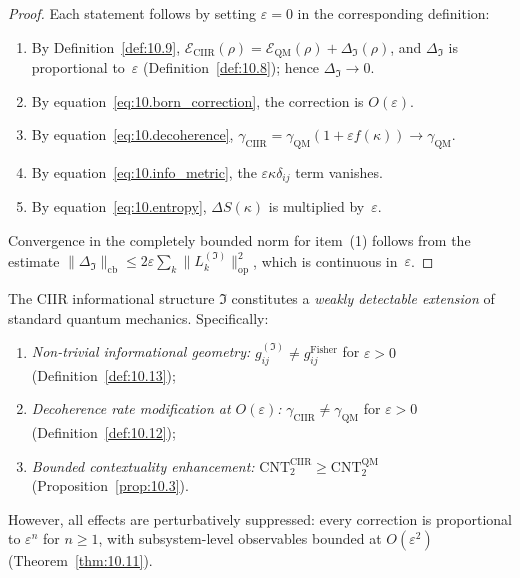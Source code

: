 \begin{proof}
Each statement follows by setting $\varepsilon=0$ in the
corresponding definition:
\begin{enumerate}
  \item By Definition~\ref{def:10.9},
    $\mathcal{E}_{\mathrm{CIIR}}(\rho)
    = \mathcal{E}_{\mathrm{QM}}(\rho)+\Delta_{\mathfrak{I}}(\rho)$,
    and $\Delta_{\mathfrak{I}}$ is proportional to~$\varepsilon$
    (Definition~\ref{def:10.8}); hence $\Delta_{\mathfrak{I}}\to 0$.
  \item By equation~\eqref{eq:10.born_correction}, the correction is
    $O(\varepsilon)$.
  \item By equation~\eqref{eq:10.decoherence},
    $\gamma_{\mathrm{CIIR}}
    = \gamma_{\mathrm{QM}}(1+\varepsilon f(\kappa))
    \to\gamma_{\mathrm{QM}}$.
  \item By equation~\eqref{eq:10.info_metric}, the
    $\varepsilon\kappa\delta_{ij}$ term vanishes.
  \item By equation~\eqref{eq:10.entropy},
    $\Delta S(\kappa)$ is multiplied by~$\varepsilon$.
\end{enumerate}
Convergence in the completely bounded norm for item~(1) follows from
the estimate $\|\Delta_{\mathfrak{I}}\|_{\mathrm{cb}}
\leq 2\varepsilon\sum_k\|L_k^{(\mathfrak{I})}\|_{\mathrm{op}}^2$,
which is continuous in~$\varepsilon$.
\end{proof}

\begin{theorem}
\label{thm:10.14}
The CIIR informational structure $\mathfrak{I}$ constitutes a
\emph{weakly detectable extension} of standard quantum mechanics.
Specifically:
\begin{enumerate}
  \item[(a)] \emph{Non-trivial informational geometry:}
    $g_{ij}^{(\mathfrak{I})}\neq g_{ij}^{\mathrm{Fisher}}$ for
    $\varepsilon>0$ (Definition~\ref{def:10.13});
  \item[(b)] \emph{Decoherence rate modification at $O(\varepsilon)$:}
    $\gamma_{\mathrm{CIIR}}\neq\gamma_{\mathrm{QM}}$ for
    $\varepsilon>0$ (Definition~\ref{def:10.12});
  \item[(c)] \emph{Bounded contextuality enhancement:}
    $\mathrm{CNT}_2^{\mathrm{CIIR}}
    \geq\mathrm{CNT}_2^{\mathrm{QM}}$
    (Proposition~\ref{prop:10.3}).
\end{enumerate}
However, all effects are perturbatively suppressed: every correction
is proportional to $\varepsilon^n$ for $n\geq 1$, with subsystem-level
observables bounded at $O(\varepsilon^2)$
(Theorem~\ref{thm:10.11}).
\end{theorem}

